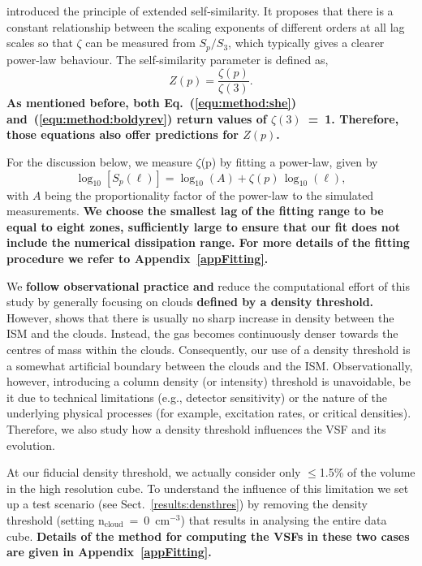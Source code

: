 \citet{Benzi1993} introduced the principle of extended self-similarity.
It proposes that there is a constant relationship between the scaling
exponents of different orders at all lag scales so that $\zeta$ can be measured from $S_p/S_3$, which typically gives a clearer power-law behaviour.
The self-similarity parameter is defined as,
\begin{equation}
	Z(p) = \frac{\zeta(p)}{\zeta(3)}.
	\label{equ:method:z_def}
\end{equation} 
\textbf{\noindent
    As mentioned before, both Eq.~(\ref{equ:method:she}) and~(\ref{equ:method:boldyrev}) return values of $\zeta(3)$~=~1.
    Therefore, those equations also offer predictions for $Z(p)$.
}

For the discussion below, we measure $\zeta$(p) by fitting a power-law,
given by
\begin{equation}
	\log_{10}\left[ S_p(\ell) \right] = \log_{10}\left(A\right) + \zeta(p) \, \log_{10}(\ell) ,
	\label{equ:method:fitting}
\end{equation}
with $A$ being the proportionality factor of the power-law to the simulated measurements.
\textbf{
We choose the smallest lag of the fitting range to be equal to eight zones, sufficiently large to ensure that our fit does not include the numerical dissipation range.
For more details of the fitting procedure we refer to Appendix~\ref{appFitting}.
}

We \textbf{follow observational practice and} reduce the computational effort of this study by generally focusing on clouds {\bf defined by a density threshold.}
However,  shows that there is usually no sharp increase in density between the ISM and the clouds. 
Instead, the gas becomes continuously denser towards the centres of mass within the clouds. 
Consequently, our use of a density threshold is a somewhat artificial boundary between the clouds and the ISM. Observationally, however, introducing a column density (or intensity) threshold is unavoidable, be it due to technical limitations (e.g., detector sensitivity) or the nature of the underlying physical processes (for example, excitation rates, or critical densities).
Therefore, we also study how a density threshold influences the VSF and its evolution.

At our fiducial density threshold, we actually consider only $\leq$1.5\% of the volume in the high resolution cube.
To understand the influence of this limitation we set up a test scenario (see Sect.~\ref{results:densthres}) by removing the density threshold (setting n$_\mathrm{cloud}$~=~0~cm$^{-3}$) that results in analysing the entire data cube.
\textbf{Details of the method for computing the VSFs in these two cases are given in Appendix~\ref{appFitting}.}

